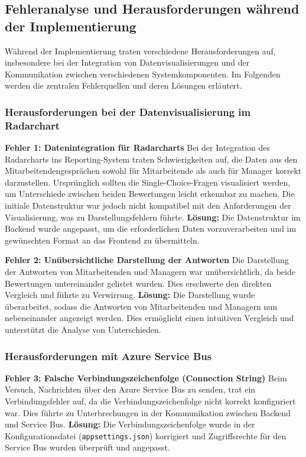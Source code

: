 \subsection{Fehleranalyse und Herausforderungen während der Implementierung}

Während der Implementierung traten verschiedene Herausforderungen auf, insbesondere bei der Integration von Datenvisualisierungen und der Kommunikation zwischen verschiedenen Systemkomponenten. Im Folgenden werden die zentralen Fehlerquellen und deren Lösungen erläutert.

\subsubsection*{Herausforderungen bei der Datenvisualisierung im Radarchart}

\item \textbf{Fehler 1: Datenintegration für Radarcharts}
Bei der Integration des Radarcharts ins Reporting-System traten Schwierigkeiten auf, die Daten aus den Mitarbeitendengesprächen sowohl für Mitarbeitende als auch für Manager korrekt darzustellen. Ursprünglich sollten die Single-Choice-Fragen visualisiert werden, um Unterschiede zwischen beiden Bewertungen leicht erkennbar zu machen. Die initiale Datenstruktur war jedoch nicht kompatibel mit den Anforderungen der Visualisierung, was zu Darstellungsfehlern führte.  
\textbf{Lösung:} Die Datenstruktur im Backend wurde angepasst, um die erforderlichen Daten vorzuverarbeiten und im gewünschten Format an das Frontend zu übermitteln.

\item \textbf{Fehler 2: Unübersichtliche Darstellung der Antworten}  
Die Darstellung der Antworten von Mitarbeitenden und Managern war unübersichtlich, da beide Bewertungen untereinander gelistet wurden. Dies erschwerte den direkten Vergleich und führte zu Verwirrung.  
\textbf{Lösung:} Die Darstellung wurde überarbeitet, sodass die Antworten von Mitarbeitenden und Managern nun nebeneinander angezeigt werden. Dies ermöglicht einen intuitiven Vergleich und unterstützt die Analyse von Unterschieden.

\subsubsection*{Herausforderungen mit Azure Service Bus}

\item \textbf{Fehler 3: Falsche Verbindungszeichenfolge (Connection String)}  
Beim Versuch, Nachrichten über den Azure Service Bus zu senden, trat ein Verbindungsfehler auf, da die Verbindungszeichenfolge nicht korrekt konfiguriert war. Dies führte zu Unterbrechungen in der Kommunikation zwischen Backend und Service Bus.  
\textbf{Lösung:} Die Verbindungszeichenfolge wurde in der Konfigurationsdatei (\texttt{appsettings.json}) korrigiert und Zugriffsrechte für den Service Bus wurden überprüft und angepasst.

